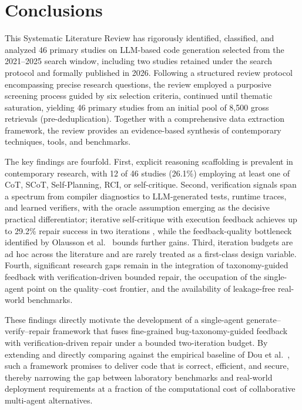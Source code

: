 \documentclass[10pt,a4paper]{article}
\begin{document}
\section{Conclusions}
\label{sec:conclusions}
This Systematic Literature Review has rigorously identified, classified, and analyzed 46 primary studies on LLM-based code generation selected from the 2021--2025 search window, including two studies retained under the search protocol and formally published in 2026. Following a structured review protocol encompassing precise research questions, the review employed a purposive screening process guided by six selection criteria, continued until thematic saturation, yielding 46 primary studies from an initial pool of 8,500 gross retrievals (pre-deduplication). Together with a comprehensive data extraction framework, the review provides an evidence-based synthesis of contemporary techniques, tools, and benchmarks.

The key findings are fourfold. First, explicit reasoning scaffolding is prevalent in contemporary research, with 12 of 46 studies (26.1\%) employing at least one of CoT, SCoT, Self-Planning, RCI, or self-critique. Second, verification signals span a spectrum from compiler diagnostics to LLM-generated tests, runtime traces, and learned verifiers, with the oracle assumption emerging as the decisive practical differentiator; iterative self-critique with execution feedback achieves up to 29.2\% repair success in two iterations \cite{dou2026}, while the feedback-quality bottleneck identified by Olausson et al.~\cite{olausson2024} bounds further gains. Third, iteration budgets are ad hoc across the literature and are rarely treated as a first-class design variable. Fourth, significant research gaps remain in the integration of taxonomy-guided feedback with verification-driven bounded repair, the occupation of the single-agent point on the quality--cost frontier, and the availability of leakage-free real-world benchmarks.

These findings directly motivate the development of a single-agent generate--verify--repair framework that fuses fine-grained bug-taxonomy-guided feedback with verification-driven repair under a bounded two-iteration budget. By extending and directly comparing against the empirical baseline of Dou et al.~\cite{dou2026}, such a framework promises to deliver code that is correct, efficient, and secure, thereby narrowing the gap between laboratory benchmarks and real-world deployment requirements at a fraction of the computational cost of collaborative multi-agent alternatives.
\end{document}

